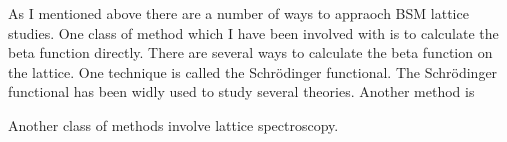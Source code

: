 As I mentioned above there are a number of ways to appraoch BSM lattice studies.
One class of method which I have been involved with is to calculate the beta function directly.
There are several ways to calculate the beta function on the lattice.
One technique is called the Schr\"{o}dinger functional.
The Schr\"{o}dinger functional has been widly used to study several theories.
Another method is 



Another class of methods involve lattice spectroscopy.

